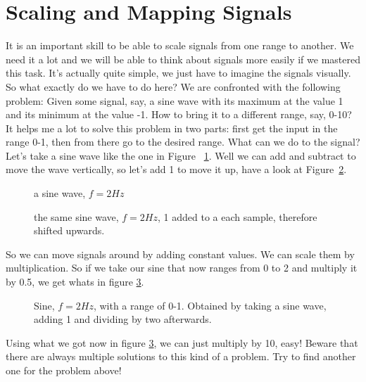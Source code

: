 \section{Scaling and Mapping Signals}
It is an important skill to be able to scale signals from one range to another. We need it a lot and we will be able to think about signals more easily if we mastered this task. It's actually quite simple, we just have to imagine the signals visually.\\
So what exactly do we have to do here? We are confronted with the following problem: Given some signal, say, a sine wave with its maximum at the value 1 and its minimum at the value -1. How to bring it to a different range, say, 0-10?\\
It helps me a lot to solve this problem in two parts: first get the input in the range 0-1, then from there go to the desired range. What can we do to the signal? Let's take a sine wave like the one in Figure ~\ref{fig:aSine}. Well we can add and subtract to move the wave vertically, so let's add 1 to move it up, have a look at Figure~\ref{fig:aShiftedSine}.

\begin{figure}[H]
	\centering
	
	\caption[a sine wave, $f=2Hz$]
	{a sine wave, $f=2Hz$}
	\label{fig:aSine}
\end{figure}

\begin{figure}[H]
	\centering
	
	\caption[a sine wave plus 1]
	{the same sine wave, $f=2Hz$, 1 added to a each sample, therefore shifted upwards.}
	\label{fig:aShiftedSine}
\end{figure}

So we can move signals around by adding constant values. We can scale them by multiplication. So if we take our sine that now ranges from 0 to 2 and multiply it by 0.5, we get whats in figure \ref{fig:sine01}.

\begin{figure}[H]
 	\centering
 	
 	\caption[sine 0 to 1]
 	{Sine, $f=2Hz$, with a range of 0-1. Obtained by taking a sine wave, adding 1 and dividing by two afterwards.}
 	\label{fig:sine01}
 \end{figure}

\hspace{1cm}

Using what we got now in figure \ref{fig:sine01}, we can just multiply by 10, easy! Beware that there are always multiple solutions to this kind of a problem. Try to find another one for the problem above!


